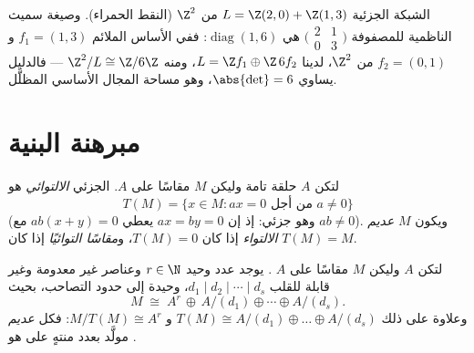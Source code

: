 \begin{omfigure}

{\small الشبكة الجزئية $L = \Z(2,0) + \Z(1,3)$ من $\Z^2$ (النقط الحمراء). وصيغة
سميث الناظمية للمصفوفة $\bigl(\begin{smallmatrix} 2 &
1\\ 0 & 3\end{smallmatrix}\bigr)$ هي $\operatorname{diag}(1, 6)$: ففي الأساس الملائم
$f_1 = (1,3)$ و $f_2 = (0,1)$ من $\Z^2$، لدينا $L = \Z f_1 \oplus \Z\,6f_2$، ومنه
$\Z^2/L \cong \Z/6\Z$ --- فالدليل يساوي $\abs{\det} = 6$، وهو مساحة المجال
الأساسي المظلَّل.}
\end{omfigure}

\section{مبرهنة البنية}

\begin{definition}\label{def:b3:modules:torsion}
لتكن $A$ حلقة تامة وليكن $M$ مقاسًا على $A$.  الجزئي
\emph{الالتوائي} هو
\[
T(M) = \{x \in M : ax = 0 \text{ من أجل } a \neq 0\}
\]
(وهو  جزئي: إذ إن $ax = by = 0$ يعطي $ab(x + y) = 0$ مع
$ab \ne 0$). ويكون $M$ \emph{عديم الالتواء} إذا كان $T(M) = 0$،
و\emph{مقاسًا التوائيًا} إذا كان $T(M) = M$.
\end{definition}

\begin{theorem}\label{thm:b3:modules:structure}
لتكن $A$  وليكن $M$ مقاسًا على $A$ . يوجد عدد وحيد $r \in \N$ وعناصر غير معدومة وغير
قابلة للقلب $d_1 \mid d_2 \mid
\cdots \mid d_s$، وحيدة إلى حدود التصاحب، بحيث
\[
M \;\cong\; A^r \,\oplus\, A/(d_1) \oplus \cdots \oplus A/(d_s).
\]
وعلاوة على ذلك $T(M) \cong A/(d_1)\oplus\dots\oplus A/(d_s)$ و $M/T(M)
\cong A^r$: فكل  \emph{عديم }
مولَّد بعدد منتهٍ على  هو .
\end{theorem}

